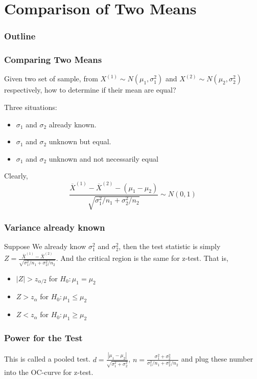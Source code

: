 \documentclass{beamer}
\begin{document}
\section{Comparison of Two Means}
\begin{frame}
    \frametitle{Outline}
    \tableofcontents[currentsection]
\end{frame}

\begin{frame}
    \frametitle{Comparing Two Means}

    Given two set of sample, from $X^{(1)}\sim N(\mu_1,\sigma_{1}^2)$ and $X^{(2)}\sim N(\mu_2,\sigma_{2}^2)$ respectively, how to determine if their mean are equal?\par

    Three situations:
    \begin{itemize}
        \item $\sigma_1$ and $\sigma_2$ already known.
        \item $\sigma_1$ and $\sigma_2$  unknown but equal.
        \item $\sigma_1$ and $\sigma_2$  unknown and not necessarily equal
    \end{itemize}
    Clearly, 
    \[\frac{\overline{X}^{(1)}-\overline{X}^{(2)}-(\mu_1-\mu_2)}{\sqrt{\sigma_1^2/n_1+\sigma_2^2/n_2}}\sim N(0,1)\]

\end{frame}

\begin{frame}
    \frametitle{Variance already known}
    Suppose We already know $\sigma_1^2$ and $\sigma_2^2$, then the test statistic is simply $Z=\frac{\overline{X}^{(1)}-\overline{X}^{(2)}}{\sqrt{\sigma_1^2/n_1+\sigma_2^2/n_2}}$. And the critical region is the same for z-test. That is, 
    \begin{itemize}
        \item $|Z|>z_{\alpha/2}$ for $H_0: \mu_1=\mu_2$
        \item $Z>z_{\alpha}$ for $H_0: \mu_1\leq \mu_2$
        \item $Z<z_{\alpha}$ for $H_0: \mu_1\geq \mu_2$
    \end{itemize}
    

\end{frame}

\begin{frame}
    \frametitle{Power for the Test}

    This is called a pooled test. $d=\frac{|\mu_1-\mu_2|}{\sqrt{\sigma_1^2+\sigma_2^2}}$, $n=\frac{\sigma_1^2+\sigma_2^2}{\sigma_1^2/n_1+\sigma_2^2/n_2}$ and plug these number into the OC-curve for z-test. 

\end{frame}
\end{document}
